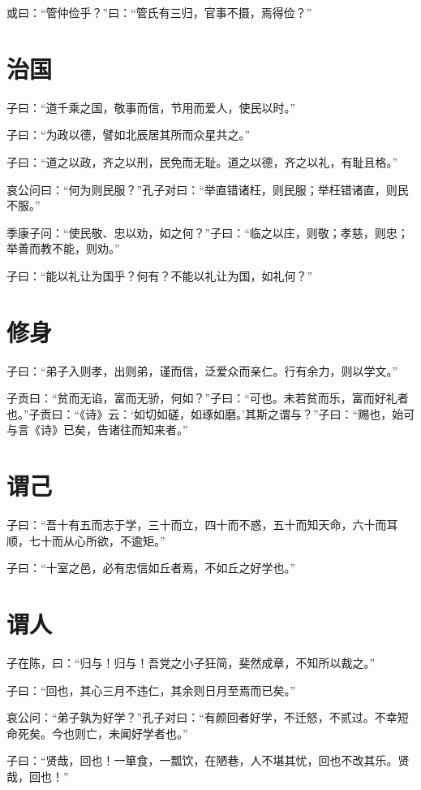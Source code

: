 \documentclass[a5paper]{ctexbook}
\begin{document}
    或曰：“管仲俭乎？”曰：“管氏有三归，官事不摄，焉得俭？”

    \chapter{治国}

    子曰：“道千乘之国，敬事而信，节用而爱人，使民以时。”

    子曰：“为政以德，譬如北辰居其所而众星共之。”

    子曰：“道之以政，齐之以刑，民免而无耻。道之以德，齐之以礼，有耻且格。”

    哀公问曰：“何为则民服？”孔子对曰：“举直错诸枉，则民服；举枉错诸直，则民不服。”

    季康子问：“使民敬、忠以劝，如之何？”子曰：“临之以庄，则敬；孝慈，则忠；举善而教不能，则劝。”

    子曰：“能以礼让为国乎？何有？不能以礼让为国，如礼何？”

    \chapter{修身}

    子曰：“弟子入则孝，出则弟，谨而信，泛爱众而亲仁。行有余力，则以学文。”

    子贡曰：“贫而无谄，富而无骄，何如？”子曰：“可也。未若贫而乐，富而好礼者也。”子贡曰：“《诗》云：‘如切如磋，如琢如磨。’其斯之谓与？”子曰：“赐也，始可与言《诗》已矣，告诸往而知来者。”

    \chapter{谓己}

    子曰：“吾十有五而志于学，三十而立，四十而不惑，五十而知天命，六十而耳顺，七十而从心所欲，不逾矩。”

    子曰：“十室之邑，必有忠信如丘者焉，不如丘之好学也。”

    \chapter{谓人}

    子在陈，曰：“归与！归与！吾党之小子狂简，斐然成章，不知所以裁之。”

    子曰：“回也，其心三月不违仁，其余则日月至焉而已矣。”

    哀公问：“弟子孰为好学？”孔子对曰：“有颜回者好学，不迁怒，不贰过。不幸短命死矣。今也则亡，未闻好学者也。”

    子曰：“贤哉，回也！一箪食，一瓢饮，在陋巷，人不堪其忧，回也不改其乐。贤哉，回也！”
\end{document}
